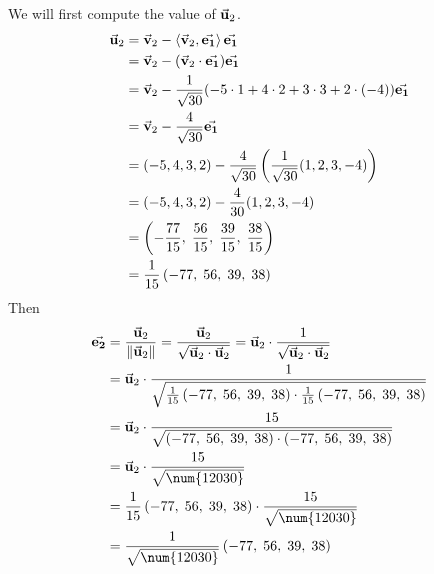     \nl We will first compute the value of $\vec{\mathbf{u}}_2$.
    \begin{align*}
        \vec{\mathbf{u}}_2 &= \vec{\mathbf{v}}_2 - \left\langle{\vec{\mathbf{v}}_2, \vec{\mathbf{e_{1}}}}\right\rangle \vec{\mathbf{e_{1}}} \\&= \vec{\mathbf{v}}_2 -( \vec{\mathbf{v}}_2 \cdot \vec{\mathbf{e_{1}}} )\vec{\mathbf{e_{1}}}\\
        &= \vec{\mathbf{v}}_2 - \frac{1}{{\sqrt{30}}}(-5\cdot 1 + 4 \cdot 2 + 3 \cdot 3 + 2 \cdot (-4))\vec{\mathbf{e_{1}}}\\
        &= \vec{\mathbf{v}}_2 - \frac{4}{\sqrt{30}}\vec{\mathbf{e_{1}}}\\
        &= (-5,4,3,2) - \frac{4}{\sqrt{30}}\left( {\frac{1}{{\sqrt{30}}}(1,2,3,-4)} \right)\\
        &=  (-5,4,3,2) - \frac{4}{30}(1,2,3,-4)\\
        &= \left( {
            -\frac{77}{15},\;
            \frac{56}{15},\;
            \frac{39}{15},\;
            \frac{38}{15}
        } \right)\\
        &= \frac{1}{{15}}\left( {-77,\; 56,\; 39,\; 38} \right)
    \end{align*}
    Then
    \begin{align*}
        \ev2 &= \frac{\bu_2}{\norm{\bu_2}} = \frac{\bu_2}{\sqrt{\bu_2\cdot\bu_2}} = \bu_2 \cdot \frac{1}{\sqrt{\bu_2\cdot \bu_2}}\\
        &= \bu_2 \cdot \over{\sqrt{ \over{15}\pars{-77,\; 56,\; 39,\; 38} \cdot  \over{15}\pars{-77,\; 56,\; 39,\; 38}}}\\
        &= \bu_2 \cdot \frac{15}{\sqrt{\pars{-77,\; 56,\; 39,\; 38} \cdot \pars{-77,\; 56,\; 39,\; 38}}}\\
        &= \bu_2 \cdot \frac{15}{\sqrt{\num{12030}}}\\
        &=  \over{15}\pars{-77,\; 56,\; 39,\; 38} \cdot \frac{15}{\sqrt{\num{12030}}}\\
        &= \over{\sqrt{\num{12030}}}\pars{-77,\; 56,\; 39,\; 38}
    \end{align*}

